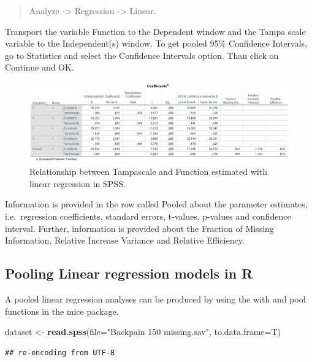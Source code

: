 \documentclass[]{book}
\newenvironment{Shaded}{\begin{snugshade}}{\end{snugshade}}
\newcommand{\KeywordTok}[1]{\textcolor[rgb]{0.13,0.29,0.53}{\textbf{#1}}}
\newcommand{\DataTypeTok}[1]{\textcolor[rgb]{0.13,0.29,0.53}{#1}}
\newcommand{\StringTok}[1]{\textcolor[rgb]{0.31,0.60,0.02}{#1}}
\newcommand{\NormalTok}[1]{#1}
\theoremstyle{definition}
\theoremstyle{definition}
\theoremstyle{definition}
\theoremstyle{remark}
\begin{document}
\begin{quote}
Analyze -\textgreater{} Regression -\textgreater{} Linear.
\end{quote}

Transport the variable Function to the Dependent window and the Tampa
scale variable to the Independent(s) window. To get pooled 95\%
Confidence Intervals, go to Statistics and select the Confidence
Intervals option. Than click on Continue and OK.

\begin{figure}

{\centering \includegraphics[width=0.9\linewidth]{images/table5.8} 

}

\caption{Relationship between Tampascale and Function estimated with linear regression in SPSS.}\label{fig:tab5-8}
\end{figure}

Information is provided in the row called Pooled about the parameter
estimates, i.e.~regression coefficients, standard errors, t-values,
p-values and confidence interval. Further, information is provided about
the Fraction of Missing Information, Relative Increase Variance and
Relative Efficiency.

\subsection{Pooling Linear regression models in
R}\label{pooling-linear-regression-models-in-r}

A pooled linear regression analyses can be produced by using the with
and pool functions in the mice package.

\begin{Shaded}
\begin{Highlighting}[]
\NormalTok{dataset <-}\StringTok{ }\KeywordTok{read.spss}\NormalTok{(}\DataTypeTok{file=}\StringTok{"Backpain 150 missing.sav"}\NormalTok{, }\DataTypeTok{to.data.frame=}\NormalTok{T)}
\end{Highlighting}
\end{Shaded}

\begin{verbatim}
## re-encoding from UTF-8
\end{verbatim}
\end{document}
